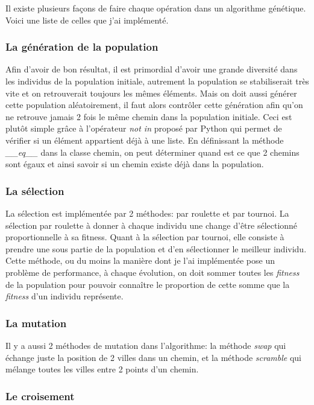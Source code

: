 \documentclass[12pt]{article}
\begin{document}
Il existe plusieurs façons de faire chaque opération dans un algorithme génétique. Voici une liste de celles que j'ai
implémenté.

\subsubsection*{La génération de la population}

Afin d'avoir de bon résultat, il est primordial d'avoir une grande diversité dans les individus de la population initiale,
autrement la population se stabiliserait très vite et on retrouverait toujours les mêmes éléments.
Mais on doit aussi générer cette population aléatoirement, il faut alors contrôler cette génération afin qu'on ne retrouve
jamais 2 fois le même chemin dans la population initiale. Ceci est plutôt simple grâce à l'opérateur \emph{not in}
proposé par Python qui permet de vérifier si un élément appartient déjà à une liste. En définissant la méthode \emph{\_\_eq\_\_}
dans la classe chemin, on peut déterminer quand est ce que 2 chemins sont égaux et ainsi savoir si un chemin existe déjà dans
la population.

\subsubsection*{La sélection}

La sélection est implémentée par 2 méthodes: par roulette et par tournoi. La sélection par
roulette à donner à chaque individu une change d'être sélectionné proportionnelle à sa
fitness. Quant à la sélection par tournoi, elle consiste à prendre une sous partie
de la population et d'en sélectionner le meilleur individu. Cette méthode, ou du moins la manière dont je l'ai
implémentée pose un problème de performance, à chaque évolution, on doit sommer toutes les \emph{fitness} de la population
pour pouvoir connaître le proportion de cette somme que la \emph{fitness} d'un individu représente.

\subsubsection*{La mutation}

Il y a aussi 2 méthodes de mutation dans l'algorithme: la méthode \emph{swap} qui échange juste
la position de 2 villes dans un chemin, et la méthode \emph{scramble} qui mélange toutes les villes
entre 2 points d'un chemin.

\subsubsection*{Le croisement}
\end{document}
